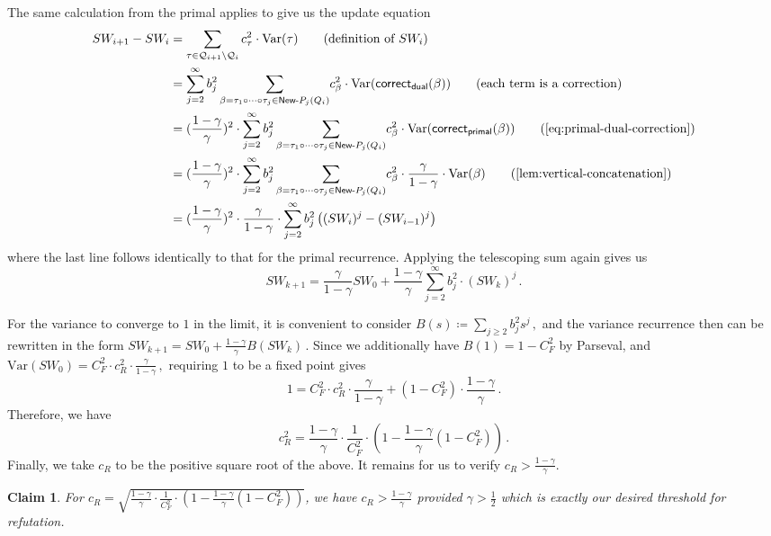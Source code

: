 \documentclass[12pt]{article}
\newcommand{\Var}{\mathrm{Var}}
\newtheorem{claim}[theorem]{Claim}
\newcommand{\calQ}{\mathcal{Q}}
\newcommand{\gam}{\gamma}
\newcommand{\corr}{\mathsf{correct}}
\begin{document}
The same calculation from the primal applies to give us the update equation
\begin{align*}
SW_{i+1} - SW_i &= \sum_{\tau\in \calQ_{i+1}\setminus \calQ_{i}} c_\tau^2  \cdot \Var(\tau) \tag{definition of \(SW_i\)} \\&= 
 \sum_{j = 2}^{\infty}{b_j^2\sum_{\beta = \tau_1 \circ \cdots \circ \tau_j \in \textsf{New-}P_j(Q_i)}}  c_\beta^2  \cdot \Var(\corr_{\mathsf{dual}}(\beta)) \tag{each term is a correction} \\ 
 &= (\frac{1-\gamma}{\gamma})^2 \cdot  \sum_{j = 2}^{\infty}{b_j^2\sum_{\beta = \tau_1 \circ \cdots \circ \tau_j \in \textsf{New-}P_j(Q_i)}}  c_\beta^2  \cdot \Var(\corr_{\mathsf{primal}}(\beta)) \tag{\cref{eq:primal-dual-correction}}
 \\&=   (\frac{1-\gamma}{\gamma})^2 \cdot \sum_{j = 2}^{\infty}{b_j^2\sum_{\beta = \tau_1 \circ \cdots \circ \tau_j \in \textsf{New-}P_j(Q_i)}}  c_\beta^2   \cdot \frac{\gamma}{1-\gam } \cdot \Var(\beta)  \tag{\cref{lem:vertical-concatenation}}
 \\&= (\frac{1-\gamma}{\gamma})^2 \cdot \frac{\gamma}{1-\gam } \cdot \sum_{j = 2}^{\infty}b_j^2 \left( (SW_i)^j - (SW_{i-1})^j\right) 
\end{align*}
where the last line follows identically to that for the primal recurrence. Applying the telescoping sum again gives us \[ 
SW_{k+1} = \frac{\gam}{1-\gamma} SW_0 + \frac{1-\gamma}{\gamma}  \sum_{j=2}^{\infty}{{b_j^2} \cdot (SW_k)^j} \,.
\] 

For the variance to converge to $1$ in the limit, it is convenient to consider \(
B(s) \coloneqq \sum_{j\ge 2} b_j^2 s^j\,,
\) 
and the variance recurrence then can be rewritten in the form \(
SW_{k+1} =SW_0 + \frac{1-\gamma}{\gamma} B(SW_{k})\,.
\)
Since we additionally have $B(1) = 1-C_F^2$ by Parseval, and \(
\Var(SW_{0}) = C_F^2 \cdot c_R^2 \cdot \frac{\gamma}{1-\gam} \,,
\) requiring $1$ to be a fixed point gives \[ 
1= C_F^2 \cdot c_R^2 \cdot \frac{\gamma}{1-\gamma} + (1-C_F^2)\cdot \frac{1-\gam}{\gam}\,.
\] 
Therefore, we have \[ 
c_R^2 = \frac{1-\gamma}{\gamma} \cdot \frac{1}{C_F^2} \cdot \left(1- \frac{1-\gam}{\gamma} (1-C_F^2) \right)\,.
\]
Finally, we take $c_R$ to be the positive square root of the above. It remains for us to verify $c_R > \frac{1-\gamma}{\gamma}$.
\begin{claim} 
	For $c_R = \sqrt{\frac{1-\gamma}{\gamma} \cdot \frac{1}{C_F^2} \cdot \left(1- \frac{1-\gam}{\gamma} (1-C_F^2) \right)}$, we have $c_R >\frac{1-\gamma}{\gamma}$ provided $\gam >\frac{1}{2}$ which is exactly our desired threshold for refutation.
\end{claim}
\end{document}
